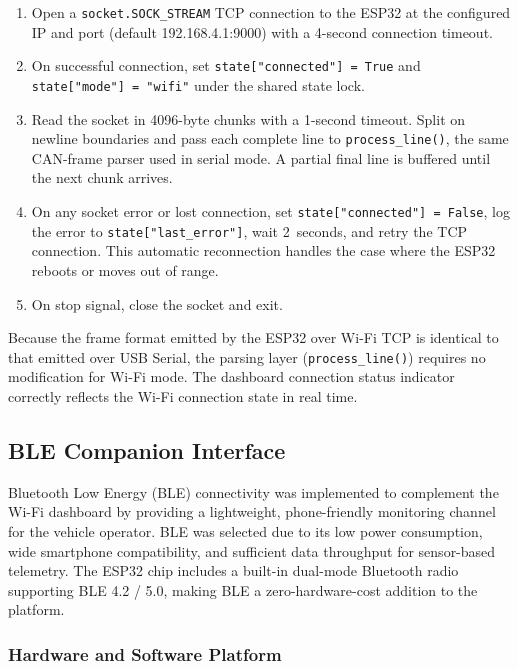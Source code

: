 \begin{enumerate}
    \item Open a \texttt{socket.SOCK\_STREAM} TCP connection to the ESP32 at the configured IP and port (default 192.168.4.1:9000) with a 4-second connection timeout.
    \item On successful connection, set \texttt{state["connected"] = True} and \texttt{state["mode"] = "wifi"} under the shared state lock.
    \item Read the socket in 4096-byte chunks with a 1-second timeout. Split on newline boundaries and pass each complete line to \texttt{process\_line()}, the same CAN-frame parser used in serial mode. A partial final line is buffered until the next chunk arrives.
    \item On any socket error or lost connection, set \texttt{state["connected"] = False}, log the error to \texttt{state["last\_error"]}, wait 2~seconds, and retry the TCP connection. This automatic reconnection handles the case where the ESP32 reboots or moves out of range.
    \item On stop signal, close the socket and exit.
\end{enumerate}

Because the frame format emitted by the ESP32 over Wi-Fi TCP is identical to that emitted over USB Serial, the parsing layer (\texttt{process\_line()}) requires no modification for Wi-Fi mode. The dashboard connection status indicator correctly reflects the Wi-Fi connection state in real time.

\subsection{BLE Companion Interface}
\label{sec:ble}

Bluetooth Low Energy (BLE) connectivity was implemented to complement the Wi-Fi dashboard by providing a lightweight, phone-friendly monitoring channel for the vehicle operator. BLE was selected due to its low power consumption, wide smartphone compatibility, and sufficient data throughput for sensor-based telemetry. The ESP32 chip includes a built-in dual-mode Bluetooth radio supporting BLE 4.2 / 5.0, making BLE a zero-hardware-cost addition to the platform.

\subsubsection*{Hardware and Software Platform}

